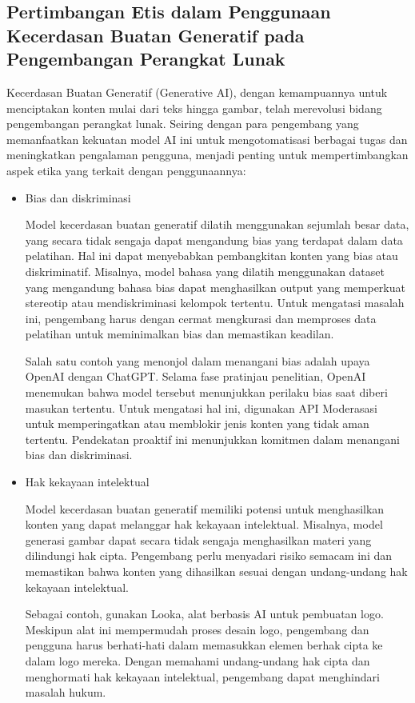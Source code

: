 \documentclass{article}
\begin{document}
\subsection{Pertimbangan Etis dalam Penggunaan Kecerdasan Buatan Generatif pada Pengembangan Perangkat Lunak}
Kecerdasan Buatan Generatif (Generative AI), dengan kemampuannya untuk menciptakan konten mulai dari teks hingga gambar, telah merevolusi bidang pengembangan perangkat lunak. Seiring dengan para pengembang yang memanfaatkan kekuatan model AI ini untuk mengotomatisasi berbagai tugas dan meningkatkan pengalaman pengguna, menjadi penting untuk mempertimbangkan aspek etika yang terkait dengan penggunaannya:
\begin{itemize}
    \item Bias dan diskriminasi

          Model kecerdasan buatan generatif dilatih menggunakan sejumlah besar data, yang secara tidak sengaja dapat mengandung bias yang terdapat dalam data pelatihan. Hal ini dapat menyebabkan pembangkitan konten yang bias atau diskriminatif. Misalnya, model bahasa yang dilatih menggunakan dataset yang mengandung bahasa bias dapat menghasilkan output yang memperkuat stereotip atau mendiskriminasi kelompok tertentu. Untuk mengatasi masalah ini, pengembang harus dengan cermat mengkurasi dan memproses data pelatihan untuk meminimalkan bias dan memastikan keadilan.

          Salah satu contoh yang menonjol dalam menangani bias adalah upaya OpenAI dengan ChatGPT. Selama fase pratinjau penelitian, OpenAI menemukan bahwa model tersebut menunjukkan perilaku bias saat diberi masukan tertentu. Untuk mengatasi hal ini, digunakan API Moderasasi untuk memperingatkan atau memblokir jenis konten yang tidak aman tertentu. Pendekatan proaktif ini menunjukkan komitmen dalam menangani bias dan diskriminasi.

    \item Hak kekayaan intelektual

          Model kecerdasan buatan generatif memiliki potensi untuk menghasilkan konten yang dapat melanggar hak kekayaan intelektual. Misalnya, model generasi gambar dapat secara tidak sengaja menghasilkan materi yang dilindungi hak cipta. Pengembang perlu menyadari risiko semacam ini dan memastikan bahwa konten yang dihasilkan sesuai dengan undang-undang hak kekayaan intelektual.

          Sebagai contoh, gunakan Looka, alat berbasis AI untuk pembuatan logo. Meskipun alat ini mempermudah proses desain logo, pengembang dan pengguna harus berhati-hati dalam memasukkan elemen berhak cipta ke dalam logo mereka. Dengan memahami undang-undang hak cipta dan menghormati hak kekayaan intelektual, pengembang dapat menghindari masalah hukum.


\end{itemize}
\end{document}
